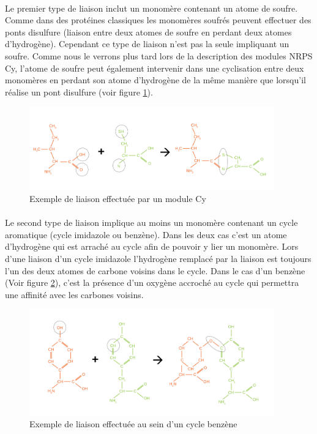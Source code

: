 \documentclass[12pt,french,twoside]{report}
\begin{document}
\paragraph{}Le premier type de liaison inclut un monomère contenant un atome de soufre.
Comme dans des protéines classiques les monomères soufrés peuvent effectuer des ponts disulfure (liaison entre deux atomes de soufre en perdant deux atomes d'hydrogène).
Cependant ce type de liaison n'est pas la seule impliquant un soufre.
Comme nous le verrons plus tard lors de la description des modules NRPS Cy, l'atome de soufre peut également intervenir dans une cyclisation entre deux monomères en perdant son atome d'hydrogène de la même manière que lorsqu'il réalise un pont disulfure (voir figure \ref{Cy_link}).

\begin{figure}[h!]
  \begin{center}
    \includegraphics[width=400px]{Figures/bio/Intro/reactions/Cy.jpg}
    \caption{\label{Cy_link}Exemple de liaison effectuée par un module Cy}
  \end{center}
\end{figure}

\paragraph{}Le second type de liaison implique au moins un monomère contenant un cycle aromatique (cycle imidazole ou benzène).
Dans les deux cas c'est un atome d'hydrogène qui est arraché au cycle afin de pouvoir y lier un monomère.
Lors d'une liaison d'un cycle imidazole l'hydrogène remplacé par la liaison est toujours l'un des deux atomes de carbone voisins dans le cycle.
Dans le cas d'un benzène (Voir figure \ref{benzene}), c'est la présence d'un oxygène accroché au cycle qui permettra une affinité avec les carbones voisins.

\begin{figure}[h!]
  \begin{center}
    \includegraphics[width=400px]{Figures/bio/Intro/reactions/aro.jpg}
    \caption{\label{benzene}Exemple de liaison effectuée au sein d'un cycle benzène}
  \end{center}
\end{figure}
\end{document}

